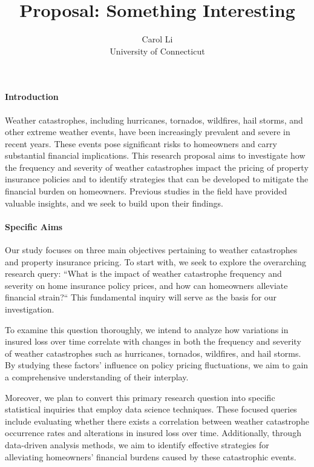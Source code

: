 \documentclass[12pt]{article}
\title{Proposal: Something Interesting}
\author{Carol Li\\
  University of Connecticut
}
\begin{document}
\maketitle


\paragraph{Introduction}
Weather catastrophes, including hurricanes, tornados, wildfires, hail storms, and other extreme weather events, have been increasingly 
prevalent and severe in recent years. These events pose significant risks to homeowners and carry substantial financial implications. 
This research proposal aims to investigate how the frequency and severity of weather catastrophes impact the pricing of property 
insurance policies and to identify strategies that can be developed to mitigate the financial burden on homeowners. Previous studies 
in the field \citep[e.g.,][]{kraehnert2021} have provided valuable insights, and we seek to build upon their findings. 

\paragraph{Specific Aims}
Our study focuses on three main objectives pertaining to weather catastrophes and property insurance pricing. To start with, we seek 
to explore the overarching research query: ``What is the impact of weather catastrophe frequency and severity on home insurance policy 
prices, and how can homeowners alleviate financial strain?`` This fundamental inquiry will serve as the basis for our investigation.

To examine this question thoroughly, we intend to analyze how variations in insured loss over time correlate with changes in both the 
frequency and severity of weather catastrophes such as hurricanes, tornados, wildfires, and hail storms. By studying these factors' 
influence on policy pricing fluctuations, we aim to gain a comprehensive understanding of their interplay.

Moreover, we plan to convert this primary research question into specific statistical inquiries that employ data science techniques. 
These focused queries include evaluating whether there exists a correlation between weather catastrophe occurrence rates and 
alterations in insured loss over time. Additionally, through data-driven analysis methods, we aim to identify effective strategies 
for alleviating homeowners' financial burdens caused by these catastrophic events.
\end{document}
